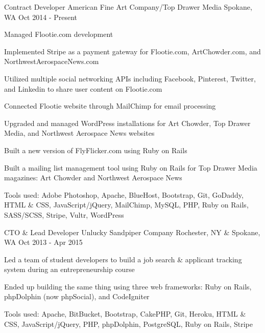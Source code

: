 \begin{cventries}
  \cventry
    {Contract Developer} %
    {American Fine Art Company/Top Drawer Media} %
    {Spokane, WA} %
    {Oct 2014 - Present} %
    {
      \begin{cvitems} %
        \item {Managed Flootie.com development}
        \item {Implemented Stripe as a payment gateway for Flootie.com, ArtChowder.com, and NorthwestAerospaceNews.com}
        \item {Utilized multiple social networking APIs including Facebook, Pinterest, Twitter, and Linkedin to share user content on Flootie.com}
        \item {Connected Flootie website through MailChimp for email processing}
        \item {Upgraded and managed WordPress installations for Art Chowder, Top Drawer Media, and Northwest Aerospace News websites}
        \item {Built a new version of FlyFlicker.com using Ruby on Rails}
        \item {Built a mailing list management tool using Ruby on Rails for Top Drawer Media magazines: Art Chowder and Northwest Aerospace News}
        \item {Tools used: Adobe Photoshop, Apache, BlueHost, Bootstrap, Git, GoDaddy, HTML \& CSS, JavaScript/jQuery, MailChimp, MySQL, PHP, Ruby on Rails, SASS/SCSS, Stripe, Vultr, WordPress}
      \end{cvitems}
    }

  \cventry
    {CTO \& Lead Developer} %
    {Unlucky Sandpiper Company} %
    {Rochester, NY \& Spokane, WA} %
    {Oct 2013 - Apr 2015} %
    {
      \begin{cvitems} %
        \item {Led a team of student developers to build a job search \& applicant tracking system during an entrepreneurship course}
        \item {Ended up building the same thing using three web frameworks: Ruby on Rails, phpDolphin (now phpSocial), and CodeIgniter}
        \item {Tools used: Apache, BitBucket, Bootstrap, CakePHP, Git, Heroku, HTML \& CSS, JavaScript/jQuery, PHP, phpDolphin, PostgreSQL, Ruby on Rails, Stripe}
      \end{cvitems}
    }


\end{cventries}
